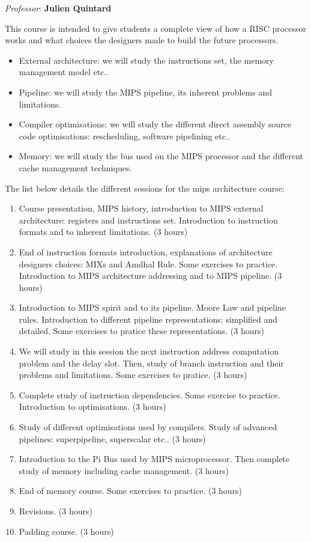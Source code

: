 \begin{multicols}{2}
\textit{Professor}: \textbf{Julien Quintard}

This course is intended to give students a complete view of how a RISC
processor works and what choices the designers made to build the future
processors.

\begin{itemize}
  \item
    External architecture: we will study the instructions set,
    the memory management model etc..
  \item
    Pipeline: we will study the MIPS pipeline, its inherent problems
    and limitations.
  \item
    Compiler optimisations: we will study the different direct assembly
    source code optimisations: rescheduling, software pipelining etc..
  \item
    Memory: we will study the bus used on the MIPS processor and
    the different cache management techniques.
\end{itemize}

The list below details the different sessions for the mips architecture
course:

\begin{enumerate}
  \item
    Course presentation, MIPS history, introduction to MIPS external
    architecture: registers and instructions set. Introduction to
    instruction formats and to inherent limitations. (3 hours)
  \item
    End of instruction formats introduction, explanations of architecture
    designers choices: MIXs and Amdhal Rule. Some exercises to practice.
    Introduction to MIPS architecture addressing and to MIPS pipeline.
    (3 hours)
  \item
    Introduction to MIPS spirit and to its pipeline. Moore Law and
    pipeline rules. Introduction to different pipeline representations:
    simplified and detailed. Some exercises to pratice these representations.
    (3 hours)
  \item
    We will study in this session the next instruction address computation
    problem and the delay slot. Then, study of branch instruction and their
    problems and limitations. Some exercises to pratice. (3 hours)
  \item
    Complete study of instruction dependencies. Some exercise to practice.
    Introduction to optimisations. (3 hours)
  \item
    Study of different optimisations used by compilers. Study of
    advanced pipelines: superpipeline, superscalar etc.. (3 hours)
  \item
    Introduction to the Pi Bus used by MIPS microprocessor. Then complete
    study of memory including cache management. (3 hours)
  \item
    End of memory course. Some exercises to practice. (3 hours)
  \item
    Revisions. (3 hours)
  \item
    Padding course. (3 hours)
\end{enumerate}




\end{multicols}
